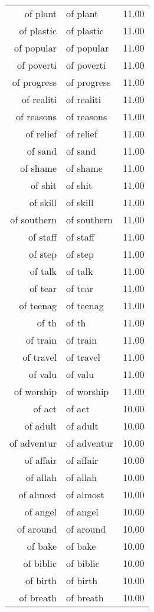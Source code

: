 \begin{table}[ht]
\begin{tabular}{rlr}
  of plant & of plant & 11.00 \\ 
  of plastic & of plastic & 11.00 \\ 
  of popular & of popular & 11.00 \\ 
  of poverti & of poverti & 11.00 \\ 
  of progress & of progress & 11.00 \\ 
  of realiti & of realiti & 11.00 \\ 
  of reasons & of reasons & 11.00 \\ 
  of relief & of relief & 11.00 \\ 
  of sand & of sand & 11.00 \\ 
  of shame & of shame & 11.00 \\ 
  of shit & of shit & 11.00 \\ 
  of skill & of skill & 11.00 \\ 
  of southern & of southern & 11.00 \\ 
  of staff & of staff & 11.00 \\ 
  of step & of step & 11.00 \\ 
  of talk & of talk & 11.00 \\ 
  of tear & of tear & 11.00 \\ 
  of teenag & of teenag & 11.00 \\ 
  of th & of th & 11.00 \\ 
  of train & of train & 11.00 \\ 
  of travel & of travel & 11.00 \\ 
  of valu & of valu & 11.00 \\ 
  of worship & of worship & 11.00 \\ 
  of act & of act & 10.00 \\ 
  of adult & of adult & 10.00 \\ 
  of adventur & of adventur & 10.00 \\ 
  of affair & of affair & 10.00 \\ 
  of allah & of allah & 10.00 \\ 
  of almost & of almost & 10.00 \\ 
  of angel & of angel & 10.00 \\ 
  of around & of around & 10.00 \\ 
  of bake & of bake & 10.00 \\ 
  of biblic & of biblic & 10.00 \\ 
  of birth & of birth & 10.00 \\ 
  of breath & of breath & 10.00 \\ 

\end{tabular}
\end{table}
